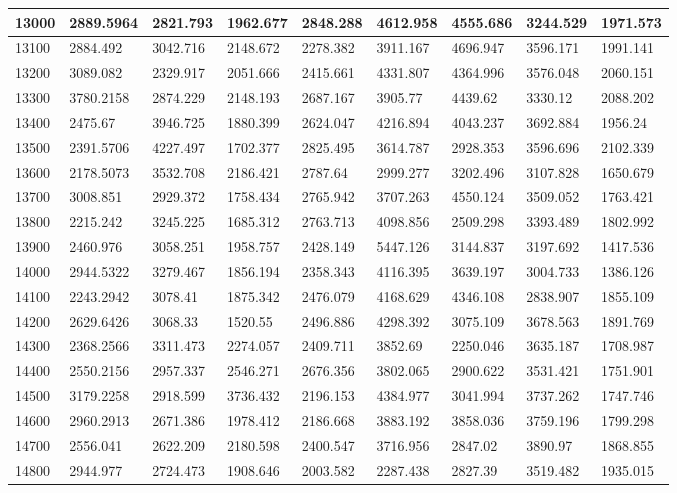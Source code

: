 \begin{table}[]
{\begin{tabular}{|l|l|l|l|l|l|l|l|l|}
13000 & 2889.5964 & 2821.793 & 1962.677 & 2848.288 & 4612.958 & 4555.686 & 3244.529 & 1971.573 \\ \hline
13100 & 2884.492 & 3042.716 & 2148.672 & 2278.382 & 3911.167 & 4696.947 & 3596.171 & 1991.141 \\ \hline
13200 & 3089.082 & 2329.917 & 2051.666 & 2415.661 & 4331.807 & 4364.996 & 3576.048 & 2060.151 \\ \hline
13300 & 3780.2158 & 2874.229 & 2148.193 & 2687.167 & 3905.77 & 4439.62 & 3330.12 & 2088.202 \\ \hline
13400 & 2475.67 & 3946.725 & 1880.399 & 2624.047 & 4216.894 & 4043.237 & 3692.884 & 1956.24 \\ \hline
13500 & 2391.5706 & 4227.497 & 1702.377 & 2825.495 & 3614.787 & 2928.353 & 3596.696 & 2102.339 \\ \hline
13600 & 2178.5073 & 3532.708 & 2186.421 & 2787.64 & 2999.277 & 3202.496 & 3107.828 & 1650.679 \\ \hline
13700 & 3008.851 & 2929.372 & 1758.434 & 2765.942 & 3707.263 & 4550.124 & 3509.052 & 1763.421 \\ \hline
13800 & 2215.242 & 3245.225 & 1685.312 & 2763.713 & 4098.856 & 2509.298 & 3393.489 & 1802.992 \\ \hline
13900 & 2460.976 & 3058.251 & 1958.757 & 2428.149 & 5447.126 & 3144.837 & 3197.692 & 1417.536 \\ \hline
14000 & 2944.5322 & 3279.467 & 1856.194 & 2358.343 & 4116.395 & 3639.197 & 3004.733 & 1386.126 \\ \hline
14100 & 2243.2942 & 3078.41 & 1875.342 & 2476.079 & 4168.629 & 4346.108 & 2838.907 & 1855.109 \\ \hline
14200 & 2629.6426 & 3068.33 & 1520.55 & 2496.886 & 4298.392 & 3075.109 & 3678.563 & 1891.769 \\ \hline
14300 & 2368.2566 & 3311.473 & 2274.057 & 2409.711 & 3852.69 & 2250.046 & 3635.187 & 1708.987 \\ \hline
14400 & 2550.2156 & 2957.337 & 2546.271 & 2676.356 & 3802.065 & 2900.622 & 3531.421 & 1751.901 \\ \hline
14500 & 3179.2258 & 2918.599 & 3736.432 & 2196.153 & 4384.977 & 3041.994 & 3737.262 & 1747.746 \\ \hline
14600 & 2960.2913 & 2671.386 & 1978.412 & 2186.668 & 3883.192 & 3858.036 & 3759.196 & 1799.298 \\ \hline
14700 & 2556.041 & 2622.209 & 2180.598 & 2400.547 & 3716.956 & 2847.02 & 3890.97 & 1868.855 \\ \hline
14800 & 2944.977 & 2724.473 & 1908.646 & 2003.582 & 2287.438 & 2827.39 & 3519.482 & 1935.015 \\ \hline

\end{tabular}}
\end{table}
